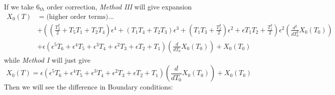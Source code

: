 \documentclass{article}
\begin{document}
	
 If we take $6_{th}$ order correction, \emph{Method III} will give expansion 
 \begin{align*}
 X_0(T) &=\text{(higher order terms)}...
 \\
 &+\left(\left(\frac{T_{3}^{2}}{2}+T_{5} T_{1}+T_{2} T_{4}\right) \epsilon^{4}+\left(T_{1} T_{4}+T_{2} T_{3}\right) \epsilon^{3}+\left(T_{1} T_{3}+\frac{T_{2}^{2}}{2}\right) \epsilon^{2}+\epsilon T_{1} T_{2}+\frac{T_{1}^{2}}{2}\right) \epsilon^{2} \left(\frac{d^{2}}{dT_{0}^{2}}X_{0}\! \left(T_{0}\right)\right)
 \\
 &+\epsilon \left(\epsilon^{5} T_{6}+\epsilon^{4} T_{5}+\epsilon^{3} T_{4}+\epsilon^{2} T_{3}+\epsilon T_{2}+T_{1}\right) \left(\frac{d}{dT_{0}}X_{0}\! \left(T_{0}\right)\right)+X_{0}\! \left(T_{0}\right)
 \end{align*}
 while \emph{Method I} will just give
 $$ X_0(T) =\epsilon \left(\epsilon^{5} T_{6}+\epsilon^{4} T_{5}+\epsilon^{3} T_{4}+\epsilon^{2} T_{3}+\epsilon T_{2}+T_{1}\right) \left(\frac{d}{dT_{0}}X_{0}\! \left(T_{0}\right)\right)+X_{0}\! \left(T_{0}\right)
$$
Then we will see the difference in Boundary conditions:
\end{document}
